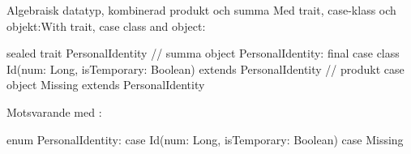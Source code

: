 \begin{Slide}{Algebraisk datatyp, kombinerad produkt och summa}\SlideFontSmall
\ifswedish Med trait, case-klass och objekt:\else With trait, case class and object:\fi
\begin{CodeSmall}
sealed trait PersonalIdentity  // summa
object PersonalIdentity:  
  final case class Id(num: Long, isTemporary: Boolean) extends PersonalIdentity // produkt
  case object Missing extends PersonalIdentity
\end{CodeSmall}
\pause 
\vspace{1em}
Motsvarande med :
\begin{Code}
enum PersonalIdentity:
  case Id(num: Long, isTemporary: Boolean)
  case Missing     
\end{Code}

\end{Slide}

